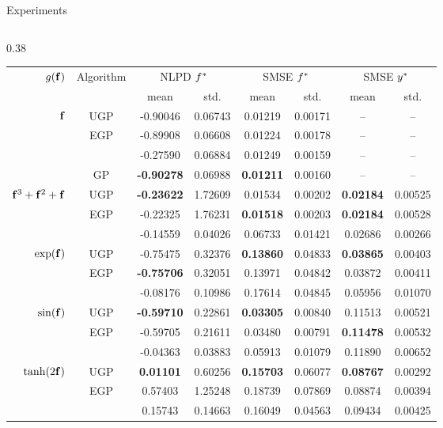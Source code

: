 \documentclass[final]{beamer}
\newlength{\twocolwid}
\begin{document}
\begin{frame}[t]
\begin{columns}[t]
\begin{column}{\twocolwid}
\begin{columns}[t,totalwidth=\twocolwid]
\begin{column}{\twocolwid}
\begin{block}{Experiments}
\begin{columns}
\begin{column}{0.38\twocolwid}
\begin{table}[tb]
    \vspace{5mm}
    \tiny
    \begin{tabular}{r|c| c c c c c c}
        \multirow{2}{*}{$g\!\left({{\mathbf{f}}}\right)$} & \multirow{2}{*}{Algorithm} & 
            \multicolumn{2}{c}{NLPD $f^{*}$} &
            \multicolumn{2}{c}{SMSE $f^{*}$} &
            \multicolumn{2}{c}{SMSE $y^{*}$} \\
        & & mean & std. & mean & std. & mean & std.\\
        \toprule
        $\mathbf{f}$ 
& UGP & -0.90046 & 0.06743 & 0.01219 & 0.00171 & -- & -- \\
& EGP & -0.89908 & 0.06608 & 0.01224 & 0.00178 & -- & -- \\
& \cite{Opper2009} & -0.27590 & 0.06884 & 0.01249 & 0.00159 & -- & -- \\
& GP & \textbf{-0.90278} & 0.06988 & \textbf{0.01211} & 0.00160 & -- & -- \\
        \midrule
        $\mathbf{f}^3 + \mathbf{f}^2 + \mathbf{f}$ 
& UGP & \textbf{-0.23622} & 1.72609 & 0.01534 & 0.00202 & \textbf{0.02184} & 0.00525 \\
& EGP & -0.22325 & 1.76231 & \textbf{0.01518} & 0.00203 & \textbf{0.02184} & 0.00528 \\
& \cite{Opper2009} & -0.14559 & 0.04026 & 0.06733 & 0.01421 & 0.02686 & 0.00266 \\
        \midrule
        $\exp\!\left({\mathbf{f}}\right)$ 
& UGP & -0.75475 & 0.32376 & \textbf{0.13860} & 0.04833 & \textbf{0.03865} & 0.00403 \\
& EGP & \textbf{-0.75706} & 0.32051 & 0.13971 & 0.04842 & 0.03872 & 0.00411 \\
& \cite{Opper2009} & -0.08176 & 0.10986 & 0.17614 & 0.04845 & 0.05956 & 0.01070 \\
        \midrule
        $\sin\!\left({\mathbf{f}}\right)$ 
& UGP & \textbf{-0.59710} & 0.22861 & \textbf{0.03305} & 0.00840 & 0.11513 & 0.00521 \\
& EGP & -0.59705 & 0.21611 & 0.03480 & 0.00791 & \textbf{0.11478} & 0.00532 \\
& \cite{Opper2009} & -0.04363 & 0.03883 & 0.05913 & 0.01079 & 0.11890 & 0.00652 \\
        \midrule
        $\tanh\!\left({2\mathbf{f}}\right)$
& UGP & \textbf{0.01101} & 0.60256 & \textbf{0.15703} & 0.06077 & \textbf{0.08767} & 0.00292 \\
& EGP & 0.57403 & 1.25248 & 0.18739 & 0.07869 & 0.08874 & 0.00394 \\
& \cite{Opper2009} & 0.15743 & 0.14663 & 0.16049 & 0.04563 & 0.09434 & 0.00425 \\
        \bottomrule
    \end{tabular}
    \label{tab:toy}
\end{table}


\end{column}
\end{columns}
\end{block}
\end{column}
\end{columns}
\end{column}
\end{columns}
\end{frame}
\end{document}
